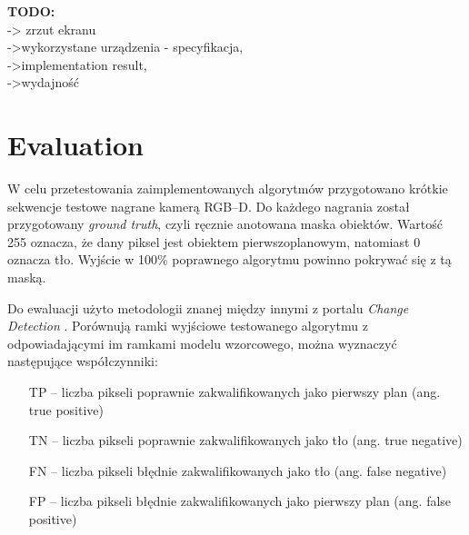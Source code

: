 \documentclass[b5paper,10pt,twoside]{article}
\begin{document}
{\textbf{TODO:}\\
-> zrzut ekranu\\
->wykorzystane urządzenia - specyfikacja,\\
->implementation result,\\
->wydajność


\section{Evaluation}
\label{sec:evaluation}

W celu przetestowania zaimplementowanych algorytmów przygotowano krótkie sekwencje testowe nagrane kamerą RGB--D. Do każdego nagrania został przygotowany \textit{ground truth}, czyli ręcznie anotowana maska obiektów. Wartość 255 oznacza, że dany piksel jest obiektem pierwszoplanowym, natomiast 0 oznacza tło. Wyjście w 100\% poprawnego algorytmu powinno pokrywać się z tą maską. 

Do ewaluacji użyto metodologii znanej między innymi z portalu \textit{Change Detection} \cite{}. Porównują ramki wyjściowe testowanego algorytmu z odpowiadającymi im ramkami modelu wzorcowego, można wyznaczyć następujące współczynniki:

\begin{enumerate}
\item[TP] – liczba pikseli poprawnie zakwalifikowanych jako pierwszy plan (ang. true positive)
\item[TN] – liczba pikseli poprawnie zakwalifikowanych jako tło (ang. true negative)
\item[FN] – liczba pikseli błędnie zakwalifikowanych jako tło (ang. false negative)
\item[FP] – liczba pikseli błędnie zakwalifikowanych jako pierwszy plan (ang. false positive)
\end{enumerate}

}
\end{document}
